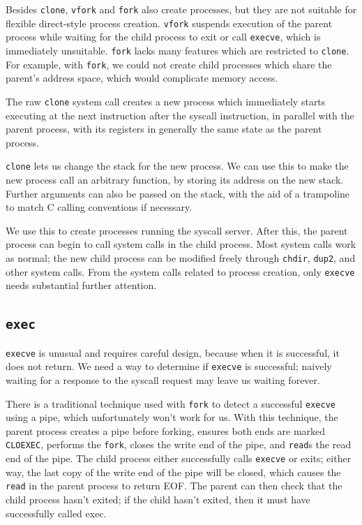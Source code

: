 \documentclass[letterpaper,twocolumn,10pt]{article}
\begin{document}
Besides \texttt{clone}, \texttt{vfork} and \texttt{fork} also create processes,
but they are not suitable for flexible direct-style process creation.
\texttt{vfork}\cite{vfork} suspends execution of the parent process
while waiting for the child process to exit or call \texttt{execve},
which is immediately unsuitable.
\texttt{fork} lacks many features which are restricted to \texttt{clone}.
For example, with \texttt{fork},
we could not create child processes which share the parent's address space,
which would complicate memory access.

The raw \texttt{clone} system call creates a new process
which immediately starts executing at the next instruction after the syscall instruction,
in parallel with the parent process,
with its registers in generally the same state as the parent process.

\texttt{clone} lets us change the stack for the new process.
We can use this to make the new process call an arbitrary function,
by storing its address on the new stack.
Further arguments can also be passed on the stack,
with the aid of a trampoline to match C calling conventions if necessary.

We use this to create processes running the syscall server.
After this,
the parent process can begin to call system calls in the child process.
Most system calls work as normal;
the new child process can be modified freely through \texttt{chdir}, \texttt{dup2}, and other system calls.
From the system calls related to process creation,
only \texttt{execve} needs substantial further attention.
\subsection{\texttt{exec}}\label{execve}
\texttt{execve} is unusual and requires careful design,
because when it is successful, it does not return.
We need a way to determine if \texttt{execve} is successful;
naively waiting for a response to the syscall request may leave us waiting forever.

There is a traditional technique used with \texttt{fork}
to detect a successful \texttt{execve} using a pipe,
which unfortunately won't work for us.
With this technique, the parent process creates a pipe before forking,
ensures both ends are marked \texttt{CLOEXEC},
performs the \texttt{fork},
closes the write end of the pipe,
and \texttt{read}s the read end of the pipe.
The child process either successfully calls \texttt{execve} or exits;
either way, the last copy of the write end of the pipe will be closed,
which causes the \texttt{read} in the parent process to return EOF.
The parent can then check that the child process hasn't exited;
if the child hasn't exited, then it must have successfully called exec.
\end{document}
